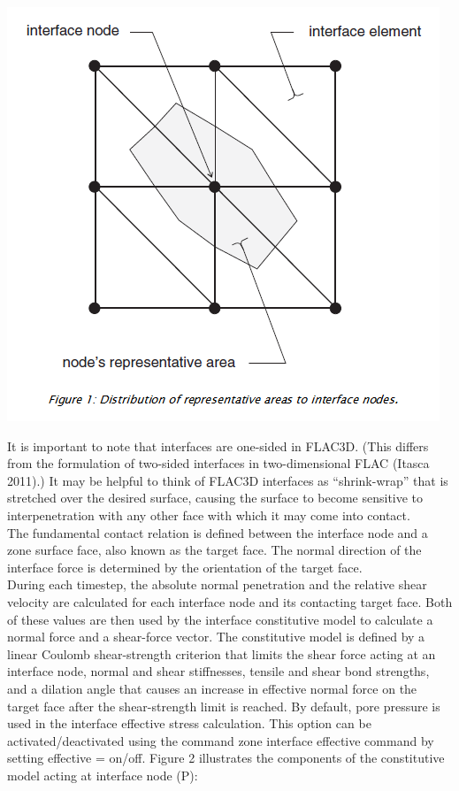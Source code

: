 \documentclass[a4paper, nobind]{templates/ociamthesis}
\begin{document}
\includegraphics[width=1\linewidth]{myfigureeeeee/interface-formulation}

It is important to note that interfaces are one-sided in FLAC3D. (This
differs from the formulation of two-sided interfaces in two-dimensional
FLAC (Itasca 2011).) It may be helpful to think of FLAC3D interfaces as
``shrink-wrap'' that is stretched over the desired surface, causing the
surface to become sensitive to interpenetration with any other face with
which it may come into contact.\\

The fundamental contact relation is defined between the interface node
and a zone surface face, also known as the target face. The normal
direction of the interface force is determined by the orientation of the
target face.\\

During each timestep, the absolute normal penetration and the relative
shear velocity are calculated for each interface node and its contacting
target face. Both of these values are then used by the interface
constitutive model to calculate a normal force and a shear-force vector.
The constitutive model is defined by a linear Coulomb shear-strength
criterion that limits the shear force acting at an interface node,
normal and shear stiffnesses, tensile and shear bond strengths, and a
dilation angle that causes an increase in effective normal force on the
target face after the shear-strength limit is reached. By default, pore
pressure is used in the interface effective stress calculation. This
option can be activated/deactivated using the command zone interface
effective command by setting effective = on/off. Figure 2 illustrates
the components of the constitutive model acting at interface node (P):
\end{document}

